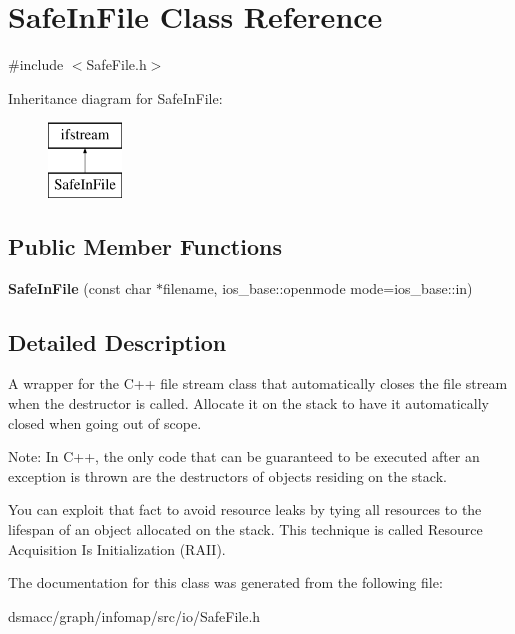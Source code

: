 \hypertarget{classSafeInFile}{}\section{Safe\+In\+File Class Reference}
\label{classSafeInFile}


{\ttfamily \#include $<$Safe\+File.\+h$>$}

Inheritance diagram for Safe\+In\+File\+:\begin{figure}[H]
\begin{center}
\leavevmode
\includegraphics[height=2.000000cm]{classSafeInFile}
\end{center}
\end{figure}
\subsection*{Public Member Functions}
\begin{DoxyCompactItemize}
\item 
\mbox{\label{classSafeInFile_af87f32791231d79d4a0744db88231d3e}} 
{\bfseries Safe\+In\+File} (const char $\ast$filename, ios\+\_\+base\+::openmode mode=ios\+\_\+base\+::in)
\end{DoxyCompactItemize}


\subsection{Detailed Description}
A wrapper for the C++ file stream class that automatically closes the file stream when the destructor is called. Allocate it on the stack to have it automatically closed when going out of scope.

Note\+: In C++, the only code that can be guaranteed to be executed after an exception is thrown are the destructors of objects residing on the stack.

You can exploit that fact to avoid resource leaks by tying all resources to the lifespan of an object allocated on the stack. This technique is called Resource Acquisition Is Initialization (R\+A\+II). 

The documentation for this class was generated from the following file\+:\begin{DoxyCompactItemize}
\item 
dsmacc/graph/infomap/src/io/Safe\+File.\+h\end{DoxyCompactItemize}
